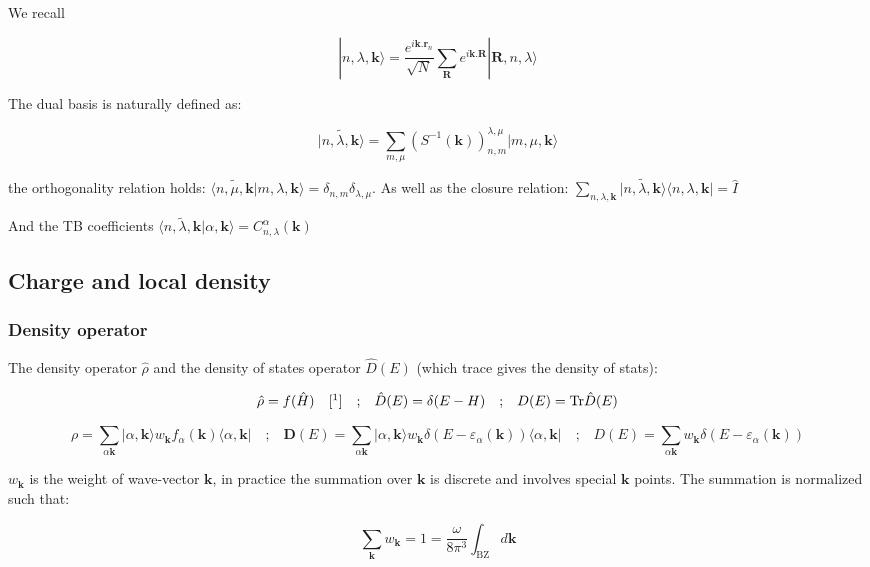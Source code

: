 \documentclass{article}
\newcommand{\bra}[1]{\langle #1|}
\newcommand{\ket}[1]{|#1\rangle}
\newcommand{\op}[1]{\hat{#1}}
\begin{document}
\noindent
We recall

\[\ket{n,\lambda,\mathbf{k}}=\frac{e^{i \mathbf{k}.\mathbf{r}_n}}{\sqrt{N}} \sum_{\mathbf{R}} e^{i \mathbf{k}.\mathbf{R}} \ket{\mathbf{R},n,\lambda }\]

\noindent
The dual basis is naturally defined as:

\[\displaystyle \widetilde{\ket{n,\lambda, \mathbf{k}}} =\sum_{m,\mu} 
(S^{-1}(\mathbf{k}))_{n,m}^{\lambda, \mu} \ket{m,\mu,\mathbf{k}}\]

\noindent the orthogonality relation holds: $\langle \widetilde{n,\mu, \mathbf{k}}|m,\lambda,\mathbf{k}\rangle=\delta_{n,m}\delta_{\lambda,\mu}$.
\noindent
As well as the closure relation:
$\displaystyle \sum_{n,\lambda,\mathbf{k} } 
\widetilde{\ket{n,\lambda,\mathbf{k}}} \bra{n,\lambda,\mathbf{k}}=\op{I}$

\noindent
And the TB coefficients $\langle 
\widetilde{n,\lambda,\mathbf{k}}|\alpha, \mathbf{k} \rangle= 
C_{n,\lambda}^{\alpha}(\mathbf{k})$

\subsection{Charge and local density}


\subsubsection{Density operator}

\noindent The density operator $\op{\rho}$ and the density of states operator $\op{D}(E)$ (which trace gives the density of stats):

\[\op{\rho}=f(\op{H})\quad[\footnote{$f(x)=\frac{1}{1+\exp(\frac{x-E_f}{k_BT})}$}]
\quad \mbox{;} \quad \op{D}(E)=\delta(E-H) \quad \mbox{;}
\quad D(E)=\mbox{Tr}\op{D}(E) \]

\[\rho=\sum_{\alpha \mathbf{k}} \ket{\alpha,\mathbf{k}} w_{\mathbf{k}} f_{\alpha}(\mathbf{k})
\bra{\alpha,\mathbf{k}} \quad \mbox{;} \quad
\bm{D}(E)=\sum_{\alpha \mathbf{k}} \ket{\alpha,\mathbf{k}}
w_{\mathbf{k}}\delta(E-\varepsilon_{\alpha}(\mathbf{k}))\bra{\alpha,\mathbf{k}} \quad \mbox{;} 
\quad D(E)=\sum_{\alpha \mathbf{k}} w_{\mathbf{k}} \delta(E-\varepsilon_{\alpha}(\mathbf{k}))
\]

\noindent
$w_{\mathbf{k}}$ is the weight of wave-vector $\mathbf{k}$, in practice the summation over
$\mathbf{k}$ is discrete and involves special $\mathbf{k}$ points. The summation is normalized such that:

\[ \sum_{\mathbf{k}}w_{\mathbf{k}}=1=  \frac{\omega}{8\pi^3}\int_{\mbox{BZ}} d\mathbf{k}\]
\end{document}
